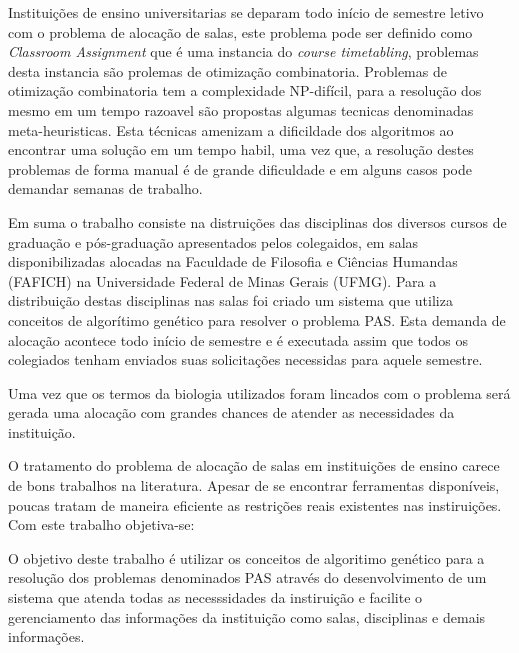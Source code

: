 \sumario
{}


Instituições de ensino universitarias se deparam todo início de semestre letivo com o problema de alocação de salas, este problema pode ser definido como \textit{Classroom Assignment} que é uma instancia do \textit{course timetabling}, problemas desta instancia são prolemas de otimização combinatoria. Problemas de otimização combinatoria tem a complexidade NP-difícil, para a resolução dos mesmo em um tempo razoavel são propostas algumas tecnicas denominadas meta-heuristicas. Esta técnicas amenizam a dificildade dos algoritmos ao encontrar uma solução em um tempo habil, uma vez que, a resolução destes problemas de forma manual é de grande dificuldade e em alguns casos pode demandar semanas de trabalho.\par


Em suma o trabalho consiste na distruições das disciplinas dos diversos cursos de graduação e pós-graduação apresentados pelos colegaidos, em salas disponibilizadas alocadas na Faculdade de Filosofia e Ciências Humandas (FAFICH) na Universidade Federal de Minas Gerais (UFMG). Para a distribuição destas disciplinas nas salas foi criado um sistema que utiliza conceitos de algorítimo genético para resolver o problema PAS. Esta demanda de alocação acontece todo início de semestre e é executada assim que todos os colegiados tenham enviados suas solicitações necessidas para aquele semestre.\par

Uma vez que os termos da biologia utilizados foram lincados com o problema será gerada uma alocação com grandes chances de atender as necessidades da instituição. \par


O tratamento do problema de alocação de salas em instituições de ensino carece de bons trabalhos na literatura. Apesar de se encontrar ferramentas disponíveis, poucas tratam de maneira eficiente as restrições reais existentes nas instiruições. Com este trabalho objetiva-se:


O objetivo deste trabalho é utilizar os conceitos de algoritimo genético para a resolução dos problemas denominados PAS através do desenvolvimento de um sistema que atenda todas as necesssidades da instiruição e facilite o gerenciamento das informações da instituição como salas, disciplinas e demais informações.

